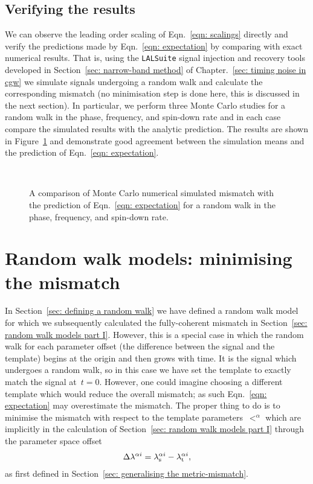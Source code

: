 \documentclass[../full_thesis/full_thesis.tex]{subfiles}
\begin{document}
\subsection{Verifying the results}
\label{sec: verifying}

We can observe the leading order scaling of Eqn.~\eqref{eqn: scalings} directly
and verify the predictions made by Eqn.~\eqref{eqn: expectation} by comparing
with exact numerical results. That is, using the \verb+LALSuite+
\cite{lalsuite}  signal injection and recovery tools developed in
Section~\ref{sec: narrow-band method} of Chapter.~\ref{sec: timing noise in
cgw} we simulate signals undergoing a random walk and calculate the
corresponding mismatch (no minimisation step is done here, this is discussed in
the next section). In particular, we perform three Monte Carlo studies for a
random walk in the phase, frequency, and spin-down rate and in each case
compare the simulated results with the analytic prediction. The results are
shown in Figure~\ref{fig: rw I} and demonstrate good agreement between the
simulation means and the prediction of Eqn.~\eqref{eqn: expectation}.

\begin{figure}[ht]
\centering
{}
\\ 
\caption{A comparison of Monte Carlo numerical simulated mismatch with the prediction
of Eqn.~\eqref{eqn: expectation} for a random walk in the phase, frequency,
and spin-down rate.}
\label{fig: rw I}
\end{figure}

\section{Random walk models: minimising the mismatch}
\label{sec: random walk models part II}
In Section~\ref{sec: defining a random walk} we have defined a random walk
model for which we subsequently calculated the fully-coherent mismatch in
Section~\ref{sec: random walk models part I}. However, this is a special case
in which the random walk for each parameter offset (the difference between the
signal and the template) begins at the origin and then grows with time. It is
the signal which undergoes a random walk, so in this case we have set the
template to exactly match the signal at~$t=0$. However, one could imagine choosing
a different template which would reduce the overall mismatch; as such
Eqn.~\eqref{eqn: expectation} may overestimate the mismatch. The proper thing to
do is to minimise the mismatch with respect to the
template parameters~$\lt^{\alpha}$ which are implicitly in the calculation of
Section~\ref{sec: random walk models part I} through the parameter space
offset
\begin{align}
\Delta \lambda^{\alpha i} = {\lambda}_\textrm{s}^{\alpha i} - {\lambda}_\textrm{t}^{\alpha i},
\end{align}
as first defined in Section~\ref{sec: generalising the metric-mismatch}.
\end{document}
